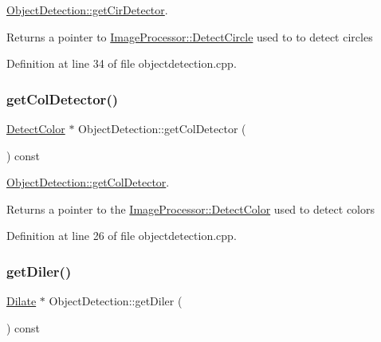 \hyperlink{class_image_processor_1_1_object_detection_a8a9535796772b425c44fd5a318adbe5f}{Object\+Detection\+::get\+Cir\+Detector}. 

\begin{DoxyReturn}{Returns}
a pointer to \hyperlink{class_image_processor_1_1_detect_circle}{Image\+Processor\+::\+Detect\+Circle} used to to detect circles 
\end{DoxyReturn}


Definition at line 34 of file objectdetection.\+cpp.

\mbox{\label{class_image_processor_1_1_object_detection_a65da5b494041b0da792dd01a90bcf065}} 
\subsubsection{\texorpdfstring{get\+Col\+Detector()}{getColDetector()}}
{\footnotesize\ttfamily \hyperlink{class_image_processor_1_1_detect_color}{Detect\+Color} $\ast$ Object\+Detection\+::get\+Col\+Detector (\begin{DoxyParamCaption}{ }\end{DoxyParamCaption}) const}



\hyperlink{class_image_processor_1_1_object_detection_a65da5b494041b0da792dd01a90bcf065}{Object\+Detection\+::get\+Col\+Detector}. 

\begin{DoxyReturn}{Returns}
a pointer to the \hyperlink{class_image_processor_1_1_detect_color}{Image\+Processor\+::\+Detect\+Color} used to detect colors 
\end{DoxyReturn}


Definition at line 26 of file objectdetection.\+cpp.

\mbox{\label{class_image_processor_1_1_object_detection_a2b5e3886ae9770e412cc4d21dfe031dd}} 
\subsubsection{\texorpdfstring{get\+Diler()}{getDiler()}}
{\footnotesize\ttfamily \hyperlink{class_image_processor_1_1_dilate}{Dilate} $\ast$ Object\+Detection\+::get\+Diler (\begin{DoxyParamCaption}{ }\end{DoxyParamCaption}) const}



